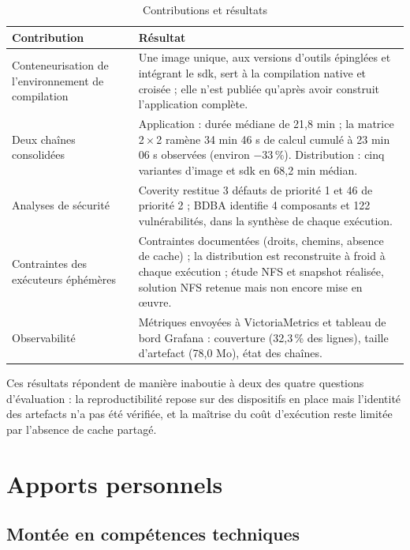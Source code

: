 \begin{table}[H]
\centering
\caption{Contributions et résultats}
\label{tab:concl-resultats}
\small
\begin{tabularx}{\textwidth}{@{}p{3.6cm} X@{}}
\toprule
\textbf{Contribution} & \textbf{Résultat} \\
\midrule
Conteneurisation de l'environnement de compilation &
  Une image unique, aux versions d'outils épinglées et intégrant le \gls{sdk},
  sert à la compilation native et croisée ; elle n'est publiée qu'après avoir
  construit l'application complète. \\
\addlinespace
Deux chaînes consolidées &
  Application : durée médiane de 21,8 min ; la matrice 2\,$\times$\,2 ramène
  34 min 46 s de calcul cumulé à 23 min 06 s observées (environ $-33\,\%$).
  Distribution : cinq variantes d'image et \gls{sdk} en 68,2 min médian. \\
\addlinespace
Analyses de sécurité &
  Coverity restitue 3 défauts de priorité 1 et 46 de priorité 2 ; BDBA
  identifie 4 composants et 122 vulnérabilités, dans la synthèse de chaque
  exécution. \\
\addlinespace
Contraintes des exécuteurs éphémères &
  Contraintes documentées (droits, chemins, absence de cache) ; la
  distribution est reconstruite à froid à chaque exécution ; étude NFS et
  snapshot réalisée, solution NFS retenue mais non encore mise en œuvre. \\
\addlinespace
Observabilité &
  Métriques envoyées à VictoriaMetrics et tableau de bord Grafana : couverture
  (32,3\,\% des lignes), taille d'artefact (78,0 Mo), état des chaînes. \\
\bottomrule
\end{tabularx}
\end{table}

Ces résultats répondent de manière inaboutie à deux des quatre questions
d'évaluation : la reproductibilité repose sur des dispositifs en place mais
l'identité des artefacts n'a pas été vérifiée, et la maîtrise du coût
d'exécution reste limitée par l'absence de cache partagé.

\section{Apports personnels}
\label{sec:concl-apports-perso}

\subsection{Montée en compétences techniques}
\label{ssec:concl-apports-technique}

